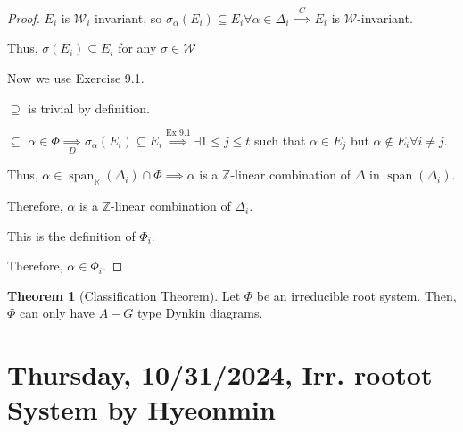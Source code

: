 \documentclass{article}
\theoremstyle{definition}
\newtheorem{theorem}{Theorem}[section]
\begin{document}
\begin{proof}
    \(E_i\) is \(\mathcal{W}_i\) invariant, so \(\sigma_\alpha (E_i) \subseteq E_i \forall \alpha \in \Delta_i \overset{C}{\implies} E_i\) is \(\mathcal{W}\)-invariant.

    Thus, \(\sigma(E_i) \subseteq E_i\) for any \(\sigma\in \mathcal{W}\) 
    
    Now we use Exercise 9.1.

    \(\supseteq\) is trivial by definition.

    \(\subseteq\) \(\alpha \in \Phi \underset{D}{\implies} \sigma_\alpha(E_i) \subseteq E_i \overset{\text{Ex 9.1}}{\implies } \exists 1 \leq j \leq t\) such that \(\alpha \in E_j\) but \(\alpha\notin E_i \forall i \neq j\).
    
    Thus, \(\alpha \in \operatorname{span}_{\mathbb{R}}(\Delta_i) \cap \Phi  \implies \alpha\) is a \(\mathbb{Z}\)-linear combination of \(\Delta\) in \(\operatorname{span}(\Delta_i)\).

    Therefore, \(\alpha\) is a \(\mathbb{Z}\)-linear combination of \(\Delta_i\).

    This is the definition of \(\Phi_i\).

    Therefore, \(\alpha \in \Phi_i\).
    
\end{proof}

\begin{theorem}
    [Classification Theorem]

    Let \(\Phi\) be an irreducible root system. Then, \(\Phi\) can only have \(A-G\) type Dynkin diagrams.
\end{theorem}

\section{Thursday, 10/31/2024, Irr. rootot System by Hyeonmin}
\end{document}
